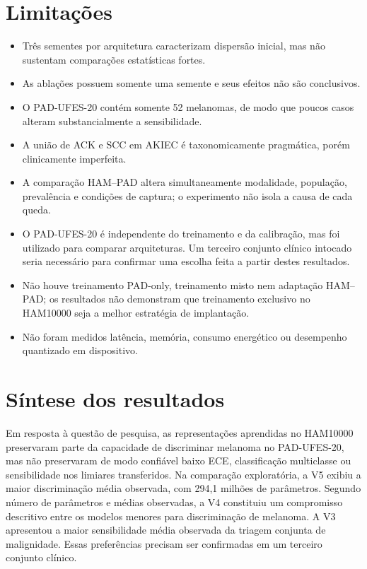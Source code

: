 \documentclass[oneside,english,brazilian]{UNISINOSmonografia}
\begin{document}
\section{Limitações}

\begin{itemize}
    \item Três sementes por arquitetura caracterizam dispersão inicial, mas não sustentam comparações estatísticas fortes.
    \item As ablações possuem somente uma semente e seus efeitos não são conclusivos.
    \item O PAD-UFES-20 contém somente 52 melanomas, de modo que poucos casos alteram substancialmente a sensibilidade.
    \item A união de ACK e SCC em AKIEC é taxonomicamente pragmática, porém clinicamente imperfeita.
    \item A comparação HAM--PAD altera simultaneamente modalidade, população, prevalência e condições de captura; o experimento não isola a causa de cada queda.
    \item O PAD-UFES-20 é independente do treinamento e da calibração, mas foi utilizado para comparar arquiteturas. Um terceiro conjunto clínico intocado seria necessário para confirmar uma escolha feita a partir destes resultados.
    \item Não houve treinamento PAD-only, treinamento misto nem adaptação HAM--PAD; os resultados não demonstram que treinamento exclusivo no HAM10000 seja a melhor estratégia de implantação.
    \item Não foram medidos latência, memória, consumo energético ou desempenho quantizado em dispositivo.
\end{itemize}

\section{Síntese dos resultados}

Em resposta à questão de pesquisa, as representações aprendidas no HAM10000 preservaram parte da capacidade de discriminar melanoma no PAD-UFES-20, mas não preservaram de modo confiável baixo ECE, classificação multiclasse ou sensibilidade nos limiares transferidos. Na comparação exploratória, a V5 exibiu a maior discriminação média observada, com 294,1 milhões de parâmetros. Segundo número de parâmetros e médias observadas, a V4 constituiu um compromisso descritivo entre os modelos menores para discriminação de melanoma. A V3 apresentou a maior sensibilidade média observada da triagem conjunta de malignidade. Essas preferências precisam ser confirmadas em um terceiro conjunto clínico.
\end{document}
